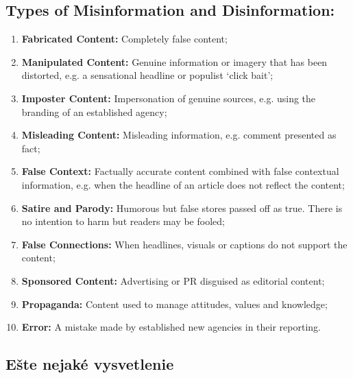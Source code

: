 \documentclass[10pt,twoside,slovak,a4paper]{article}
\begin{document}
\subsection{Types of Misinformation and Disinformation:} \label{ina:Types}


\cite{pdf-factsheet}



\begin{enumerate}
\item \textbf{Fabricated Content:} Completely false content;
\item \textbf{Manipulated Content:} Genuine information or imagery that has been distorted, e.g. a 
sensational headline or populist ‘click bait’;
\item \textbf{Imposter Content:} Impersonation of genuine sources, e.g. using the branding of an established 
agency;
\item \textbf{Misleading Content:} Misleading information, e.g. comment presented as fact;
\item \textbf{False Context:} Factually accurate content combined with false contextual information, e.g. when 
the headline of an article does not reflect the content;
\item \textbf{Satire and Parody:} Humorous but false stores passed off as true. There is no intention to harm 
but readers may be fooled;
\item \textbf{False Connections:} When headlines, visuals or captions do not support the content;
\item \textbf{Sponsored Content:} Advertising or PR disguised as editorial content;
\item \textbf{Propaganda:} Content used to manage attitudes, values and knowledge;
\item \textbf{Error:} A mistake made by established new agencies in their reporting. 
	
\end{enumerate}


\subsection{Ešte nejaké vysvetlenie} \label{ina:este}
\end{document}
